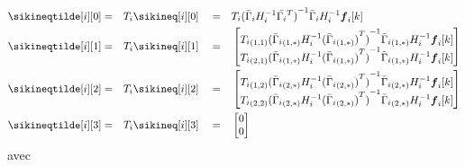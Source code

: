 \documentclass[../main.tex]{subfiles}
\begin{document}
\begin{align}
  \sikineqtilde[i][0]&=&&T_{i}\sikineq[i][0]&&=&&T_{i}{(\linearcoefi)}^{-1}\bar{\Gamma}_{i}H_{i}^{-1}\vec{f}_{i}[k]\\
  \sikineqtilde[i][1]&=&&T_{i} \sikineq[i][1]&&=&& \left[
                                                   \begin{matrix}
                                                     \elem[1,1]{T_{i}}{{(\linearcoefiineqnonzero[1,*])}^{-1}}\elem[1,*]{\bar{\Gamma}_{i}}H_{i}^{-1}\vec{f}_{i}[k]\\
                                                     \elem[2,1]{T_{i}}{{(\linearcoefiineqnonzero[1,*])}^{-1}}\elem[1,*]{\bar{\Gamma}_{i}}H_{i}^{-1}\vec{f}_{i}[k]\\
                                                   \end{matrix}
  \right]\\
  \sikineqtilde[i][2]&=&&T_{i} \sikineq[i][2]&&=&& \left[
                                                   \begin{matrix}
                                                     \elem[1,2]{T_{i}}{{(\linearcoefiineqnonzero[2,*])}^{-1}}\elem[2,*]{\bar{\Gamma}_{i}}H_{i}^{-1}\vec{f}_{i}[k]\\
                                                     \elem[2,2]{T_{i}}{{(\linearcoefiineqnonzero[2,*])}^{-1}}\elem[2,*]{\bar{\Gamma}_{i}}H_{i}^{-1}\vec{f}_{i}[k]\\
                                                   \end{matrix}
  \right]
  \\
  \sikineqtilde[i][3]&=&&T_{i}\sikineq[i][3] &&=&&\left[
                                                   \begin{matrix}
                                                     0\\ 0
                                                   \end{matrix}
  \right]
\end{align}
avec
\end{document}
